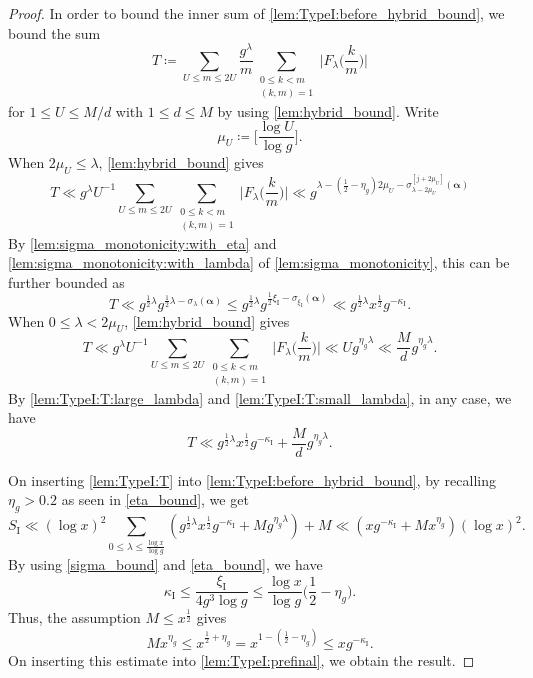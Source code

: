 \documentclass[hidelinks]{amsart}
\numberwithin{equation}{section}
\theoremstyle{plain}
\theoremstyle{definition}
\begin{document}
\begin{proof}
In order to bound the inner sum of \cref{lem:TypeI:before_hybrid_bound}, we bound the sum
\[
T
\coloneqq
\sum_{U\le m\le2U}
\frac{g^{\lambda}}{m}
\sum_{\substack{
0\le k<m\\
(k,m)=1}}
\biggl|F_{\lambda}\biggl(\frac{k}{m}\biggr)\biggr|
\]
for $1\le U\le M/d$ with $1\le d\le M$ by using \cref{lem:hybrid_bound}. Write
\[
\mu_{U}
\coloneqq
\biggl[\frac{\log U}{\log g}\biggr].
\]
When $2\mu_{U}\le\lambda$, \cref{lem:hybrid_bound} gives
\[
T
\ll
g^{\lambda}U^{-1}
\sum_{U\le m\le2U}
\sum_{\substack{
0\le k<m\\
(k,m)=1}}
\biggl|F_{\lambda}\biggl(\frac{k}{m}\biggr)\biggr|
\ll
g^{\lambda-(\frac{1}{2}-\eta_{g})2\mu_{U}-\sigma_{\lambda-2\mu_{U}}^{[j+2\mu_{U}]}(\bm{\alpha})}
\]
By \cref{lem:sigma_monotonicity:with_eta} and \cref{lem:sigma_monotonicity:with_lambda}
of \cref{lem:sigma_monotonicity}, this can be further bounded as
\begin{equation}
\label{lem:TypeI:T:large_lambda}
T
\ll
g^{\frac{1}{2}\lambda}g^{\frac{1}{2}\lambda-\sigma_{\lambda}(\bm{\alpha})}
\le
g^{\frac{1}{2}\lambda}g^{\frac{1}{2}\xi_{\mathrm{I}}-\sigma_{\xi_{\mathrm{I}}}(\bm{\alpha})}
\ll
g^{\frac{1}{2}\lambda}
x^{\frac{1}{2}}
g^{-\kappa_{\mathrm{I}}}.
\end{equation}
When $0\le\lambda<2\mu_{U}$, \cref{lem:hybrid_bound} gives
\begin{equation}
\label{lem:TypeI:T:small_lambda}
T
\ll
g^{\lambda}U^{-1}
\sum_{U\le m\le2U}
\sum_{\substack{
0\le k<m\\
(k,m)=1}}
\biggl|F_{\lambda}\biggl(\frac{k}{m}\biggr)\biggr|
\ll
Ug^{\eta_{g}\lambda}
\ll
\frac{M}{d}g^{\eta_{g}\lambda}.
\end{equation}
By \cref{lem:TypeI:T:large_lambda} and \cref{lem:TypeI:T:small_lambda}, in any case, we have
\begin{equation}
\label{lem:TypeI:T}
T
\ll
g^{\frac{1}{2}\lambda}
x^{\frac{1}{2}}
g^{-\kappa_{\mathrm{I}}}
+
\frac{M}{d}g^{\eta_{g}\lambda}.
\end{equation}

On inserting \cref{lem:TypeI:T} into \cref{lem:TypeI:before_hybrid_bound},
by recalling $\eta_{g}>0.2$ as seen in \cref{eta_bound}, we get
\begin{equation}
\label{lem:TypeI:prefinal}
S_{\mathrm{I}}
\ll
(\log x)^{2}
\sum_{0\le\lambda\le\frac{\log x}{\log g}}
(g^{\frac{1}{2}\lambda}
x^{\frac{1}{2}}
g^{-\kappa_{\mathrm{I}}}
+
Mg^{\eta_{g}\lambda})
+M
\ll
(xg^{-\kappa_{\mathrm{I}}}
+
Mx^{\eta_{g}})
(\log x)^{2}.
\end{equation}
By using \cref{sigma_bound} and \cref{eta_bound}, we have
\[
\kappa_{\mathrm{I}}
\le
\frac{\xi_{\mathrm{I}}}{4g^{3}\log g}
\le
\frac{\log x}{\log g}\biggl(\frac{1}{2}-\eta_{g}\biggr).
\]
Thus, the assumption $M\le x^{\frac{1}{2}}$ gives
\[
Mx^{\eta_{g}}
\le
x^{\frac{1}{2}+\eta_{g}}
=
x^{1-(\frac{1}{2}-\eta_{g})}
\le
xg^{-\kappa_{\mathrm{I}}}.
\]
On inserting this estimate into \cref{lem:TypeI:prefinal},
we obtain the result.
\end{proof}
\end{document}
